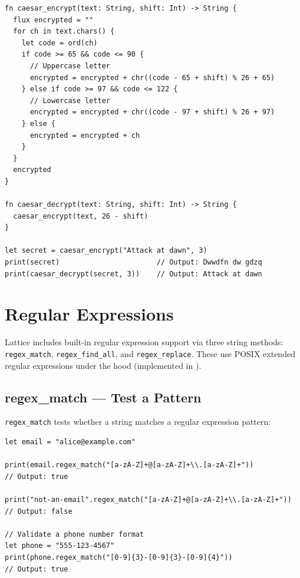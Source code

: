 \begin{lstlisting}[language=Lattice, caption={A simple Caesar cipher}]
fn caesar_encrypt(text: String, shift: Int) -> String {
  flux encrypted = ""
  for ch in text.chars() {
    let code = ord(ch)
    if code >= 65 && code <= 90 {
      // Uppercase letter
      encrypted = encrypted + chr((code - 65 + shift) % 26 + 65)
    } else if code >= 97 && code <= 122 {
      // Lowercase letter
      encrypted = encrypted + chr((code - 97 + shift) % 26 + 97)
    } else {
      encrypted = encrypted + ch
    }
  }
  encrypted
}

fn caesar_decrypt(text: String, shift: Int) -> String {
  caesar_encrypt(text, 26 - shift)
}

let secret = caesar_encrypt("Attack at dawn", 3)
print(secret)                       // Output: Dwwdfn dw gdzq
print(caesar_decrypt(secret, 3))    // Output: Attack at dawn
\end{lstlisting}

\section{Regular Expressions}\label{sec:regex}

Lattice includes built-in regular expression support via three string methods: \lstinline|regex_match|, \lstinline|regex_find_all|, and \lstinline|regex_replace|. These use POSIX extended regular expressions under the hood (implemented in ).

\subsection{regex\_match --- Test a Pattern}\label{sec:regex-match}

\lstinline|regex_match| tests whether a string matches a regular expression pattern:

\begin{lstlisting}[language=Lattice, caption={Pattern matching with regex}]
let email = "alice@example.com"

print(email.regex_match("[a-zA-Z]+@[a-zA-Z]+\\.[a-zA-Z]+"))
// Output: true

print("not-an-email".regex_match("[a-zA-Z]+@[a-zA-Z]+\\.[a-zA-Z]+"))
// Output: false

// Validate a phone number format
let phone = "555-123-4567"
print(phone.regex_match("[0-9]{3}-[0-9]{3}-[0-9]{4}"))
// Output: true
\end{lstlisting}

